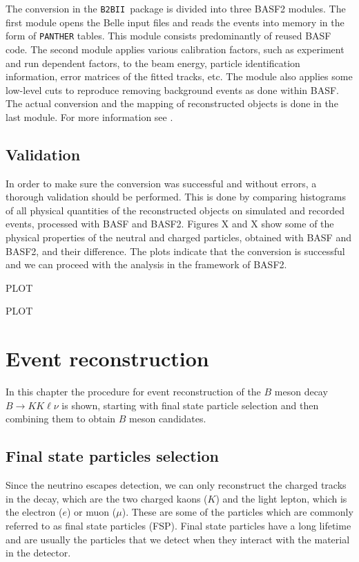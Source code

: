 \documentclass[headings=standardclasses,headings=big,oneside,a4paper,openany,12pt]{scrbook}
\newcommand {\btbii}{\texttt{B2BII}}
\begin{document}
The conversion in the \btbii~package is divided into three BASF2 modules. The first module opens the Belle input files and reads the events into memory in the form of \texttt{PANTHER} tables. This module consists predominantly of reused BASF code. The second module applies various calibration factors, such as experiment and run dependent factors, to the beam energy, particle identification information, error matrices of the fitted tracks, etc. The module also applies some low-level cuts to reproduce removing background events as done within BASF. The actual conversion and the mapping of reconstructed objects is done in the last module. For more information see \cite{Keck:48940}.

\section{Validation}

In order to make sure the conversion was successful and without errors, a thorough validation should be performed. This is done by comparing histograms of all physical quantities of the reconstructed objects on simulated and recorded events, processed with BASF and BASF2. Figures X and X show some of the physical properties of the neutral and charged particles, obtained with BASF and BASF2, and their difference. The plots indicate that the conversion is successful and we can proceed with the analysis in the framework of BASF2.

PLOT

PLOT

\chapter{Event reconstruction}

In this chapter the procedure for event reconstruction of the $B$ meson decay $B \to K K \ell \nu$ is shown, starting with final state particle selection and then combining them to obtain $B$ meson candidates.

\section{Final state particles selection}

Since the neutrino escapes detection, we can only reconstruct the charged tracks in the decay, which are the two charged kaons ($K$) and the light lepton, which is the electron ($e$) or muon ($\mu$). These are some of the particles which are commonly referred to as final state particles (FSP). Final state particles have a long lifetime and are usually the particles that we detect when they interact with the material in the detector.
\end{document}
